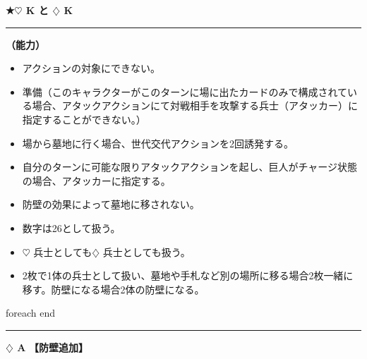 \documentclass[twocolumn,a5paper,papersize,10pt]{jarticle}
\begin{document}
\vspace{2mm}
\begin{tcolorbox}[title={\small\bf【Character】巨人}{\scriptsize （兵士）}]

  {\scriptsize\bf ★{\normalsize $\heartsuit$} K と {\normalsize $\diamondsuit$} K}

\vspace{1mm} %
\hrule height 0.1mm depth 0mm width 62mm %
\vspace{1mm} %

{\bf（能力）}


\vspace{-1zh}%
\begin{itemize}
\setlength{\leftskip}{-0.3cm}
\setlength{\parskip}{0pt} %

\item アクションの対象にできない。

\item 準備（このキャラクターがこのターンに場に出たカードのみで構成されている場合、アタックアクションにて対戦相手を攻撃する兵士（アタッカー）に指定することができない。）

\item 場から墓地に行く場合、世代交代アクションを2回誘発する。

\item 自分のターンに可能な限りアタックアクションを起し、巨人がチャージ状態の場合、アタッカーに指定する。

\item 防壁の効果によって墓地に移されない。

\item 数字は26として扱う。

\item {\normalsize $\heartsuit$} 兵士としても{\normalsize $\diamondsuit$} 兵士としても扱う。

\item 2枚で1体の兵士として扱い、墓地や手札など別の場所に移る場合2枚一緒に移す。防壁になる場合2体の防壁になる。
\vspace{-1zh}%
\end{itemize}

\vspace{1mm} %
\end{tcolorbox}

\vspace{-1zh}
 foreach end
 

\vspace{3mm} %
\hrule height 0.5mm depth 0mm width 66.5mm %
\vspace{1mm} %
{\Large\bf $\diamondsuit$ A} {\normalsize\bf【防壁追加】} %
\vspace{1mm} %
\end{document}
